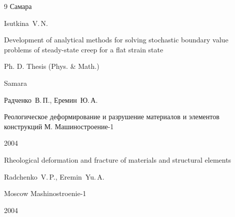 \begin{thebibliography}{9}
\publaddr Самара 



\misctransl

\by Isutkina~V.\,N.

\thesis Development of analytical methods for solving stochastic boundary value problems of  steady-state creep for a flat strain state

\thesisinfo Ph. D. Thesis (Phys. \& Math.)

\publaddr Samara









 \by Радченко~В.\,П., Еремин~Ю.\,А.

\book Реологическое деформирование и разрушение материалов и элементов конструкций \publaddr М. \publ Машиностроение-1 \yr

2004 

\misctransl

\book Rheological deformation and fracture of materials and structural elements

\by Radchenko~V.\,P., Eremin~Yu.\,A.

\publaddr Moscow \publ Mashinostroenie-1 \yr

2004 





\end{thebibliography}







\noindent

\hskip6.5cm \thedate \par\noindent

\hskip6.5cm\therevdate





\newpage






{}



\makeengtitlem



\newpage



%

